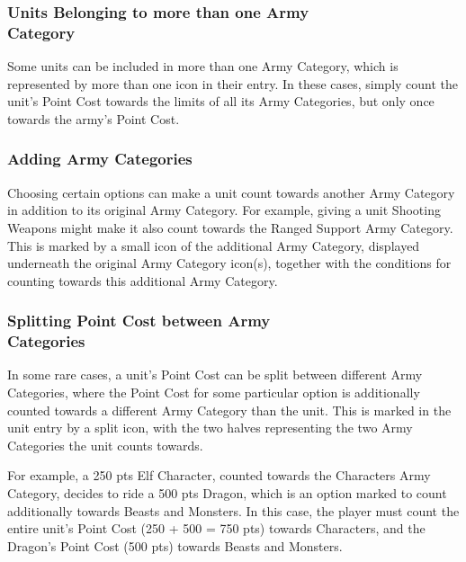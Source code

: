 \subsubsection[Units Belonging to more than one Army Category]{Units Belonging to more than one Army\\ Category}

Some units can be included in more than one Army Category, which is represented by more than one icon in their entry. In these cases, simply count the unit's Point Cost towards the limits of all its Army Categories, but only once towards the army's Point Cost.

\subsubsection{Adding Army Categories}

Choosing certain options can make a unit count towards another Army Category in addition to its original Army Category. For example, giving a unit Shooting Weapons might make it also count towards the Ranged Support Army Category. This is marked by a small icon of the additional Army Category, displayed underneath the original Army Category icon(s), together with the conditions for counting towards this additional Army Category.

\subsubsection[Splitting Point Cost between Army Categories]{Splitting Point Cost between Army\\ Categories}

In some rare cases, a unit's Point Cost can be split between different Army Categories, where the Point Cost for some particular option is additionally counted towards a different Army Category than the unit. This is marked in the unit entry by a split icon, with the two halves representing the two Army Categories the unit counts towards.

For example, a 250 pts Elf Character, counted towards the Characters Army Category, decides to ride a 500 pts Dragon, which is an option marked to count additionally towards Beasts and Monsters. In this case, the player must count the entire unit's Point Cost (250 + 500 = 750 pts) towards Characters, and the Dragon's Point Cost (500 pts) towards Beasts and Monsters.

\newcommand{\tinmen}{Tin Men}
\newcommand{\tinman}{Tin Man}
\newcommand{\tinmansheart}{Tin Man's Heart}
\newcommand{\tinmansheartdef}{The model must reroll failed to-hit rolls against enemy models with Fear.}
\newcommand{\figTINMENHeader}{Header}
\newcommand{\figTINMENUnitProfile}{Unit\\ Profile}
\newcommand{\figTINMENOptions}{Options}

